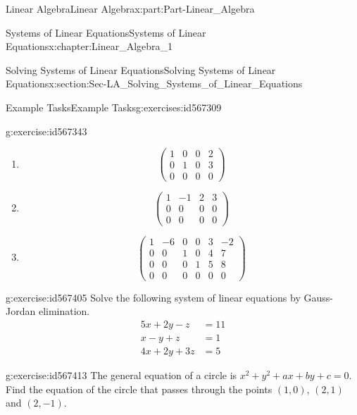 \documentclass[oneside,10pt,]{book}
\numberwithin{equation}{section}
\newcommand{\amp}{&}
\begin{document}
\begin{partptx}{Linear Algebra}{}{Linear Algebra}{}{}{x:part:Part-Linear_Algebra}
\begin{chapterptx}{Systems of Linear Equations}{}{Systems of Linear Equations}{}{}{x:chapter:Linear_Algebra_1}
\begin{sectionptx}{Solving Systems of Linear Equations}{}{Solving Systems of Linear Equations}{}{}{x:section:Sec-LA_Solving_Systems_of_Linear_Equations}
\begin{exercises-subsection-numberless}{Example Tasks}{}{Example Tasks}{}{}{g:exercises:id567309}
\begin{divisionexercise}{1}{}{}{g:exercise:id567343}
\begin{enumerate}[label=(\alph*).]
\begin{equation*}
\end{equation*}
%
\item{}%
\begin{equation*}
\begin{pmatrix} 1 \amp 0 \amp 0 \amp 2 \\ 0 \amp 1 \amp 0 \amp 3 \\ 0 \amp 0 \amp 0 \amp 0 \end{pmatrix} 
\end{equation*}
%
\item{}%
\begin{equation*}
\begin{pmatrix} 1 \amp -1 \amp 2 \amp 3 \\ 0 \amp 0 \amp 0 \amp 0 \\ 0 \amp 0 \amp 0 \amp 0 \end{pmatrix} 
\end{equation*}
%
\item{}%
\begin{equation*}
\begin{pmatrix} 1 \amp -6 \amp 0 \amp 0 \amp 3 \amp -2 \\ 0 \amp 0 \amp 1 \amp 0 \amp 4 \amp 7 \\ 0 \amp 0 \amp 0 \amp 1 \amp 5 \amp 8 \\ 0 \amp 0 \amp 0 \amp 0 \amp 0 \amp 0 \end{pmatrix} 
\end{equation*}
%
\end{enumerate}
%
\end{divisionexercise}%
\begin{divisionexercise}{2}{}{}{g:exercise:id567405}%
Solve the following system of linear equations by Gauss-Jordan elimination.%
\begin{align*}
5x+2y-z \amp =11\\
x-y+z \amp =1\\
4x+2y+3z \amp =5
\end{align*}
%
\end{divisionexercise}%
\begin{divisionexercise}{3}{}{}{g:exercise:id567413}%
The general equation of a circle is \(x^2+y^2+ax+by+c=0\). Find the equation of the circle that passes through the points \((1,0)\), \((2,1)\) and \((2,-1)\).%
\end{divisionexercise}%
\end{exercises-subsection-numberless}
\end{sectionptx}
\end{chapterptx}
%
\typeout{************************************************}

\end{partptx}
\end{document}
